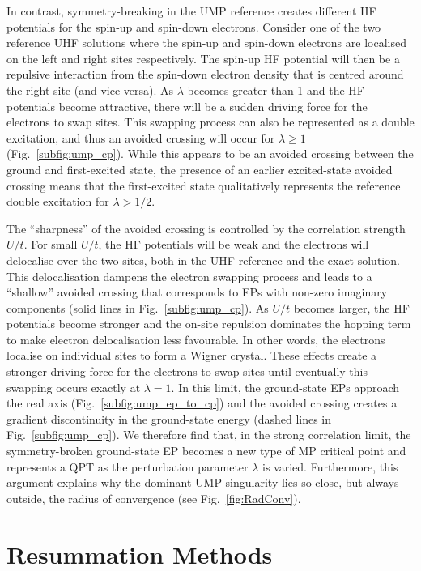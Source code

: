 \documentclass[aps,prb,reprint,noshowkeys,superscriptaddress]{revtex4-1}
\newcommand{\hugh}[1]{\textcolor{hughgreen}{#1}}
\begin{document}
In contrast, symmetry-breaking in the UMP reference creates different HF potentials for the spin-up and spin-down electrons.
Consider one of the two reference UHF solutions where the spin-up and spin-down electrons are localised on the left and right sites respectively. 
The spin-up HF potential will then be a repulsive interaction from the spin-down electron 
density that is centred around the right site (and vice-versa).
As $\lambda$ becomes greater than 1 and the HF potentials become attractive, there will be a sudden
driving force for the electrons to swap sites.
This swapping process can also be represented as a double excitation, and thus an avoided crossing will occur
for $\lambda \geq 1$ (Fig.~\ref{subfig:ump_cp}).
While this appears to be an avoided crossing between the ground and first-excited state, 
the presence of an earlier excited-state avoided crossing means that the first-excited state qualitatively 
represents the reference double excitation for $\lambda > 1/2$.

The ``sharpness'' of the avoided crossing is controlled by the correlation strength $U/t$.
For small $U/t$, the HF potentials will be weak and the electrons will delocalise over the two sites,
both in the UHF reference and \hugh{the exact solution}.
This delocalisation dampens the electron swapping process and leads to a ``shallow'' avoided crossing
that corresponds to EPs with non-zero imaginary components (solid lines in Fig.~\ref{subfig:ump_cp}).
As $U/t$ becomes larger, the HF potentials become stronger and the on-site repulsion dominates the hopping
term to make electron delocalisation less favourable.
In other words, the electrons localise on individual sites to form a Wigner crystal.
These effects create a stronger driving force for the electrons to swap sites until eventually this swapping
occurs exactly at $\lambda = 1$.
In this limit, the ground-state EPs approach the real axis (Fig.~\ref{subfig:ump_ep_to_cp}) and the avoided 
crossing creates a gradient discontinuity in the ground-state energy (dashed lines in Fig.~\ref{subfig:ump_cp}).
We therefore find that, in the strong correlation limit, the symmetry-broken ground-state EP becomes
a new type of MP critical point and represents a QPT as the perturbation parameter $\lambda$ is varied.
Furthermore, this argument explains why the dominant UMP singularity lies so close, but always outside, the 
radius of convergence (see Fig.~\ref{fig:RadConv}).

\section{Resummation Methods}
\label{sec:Resummation}
\end{document}
